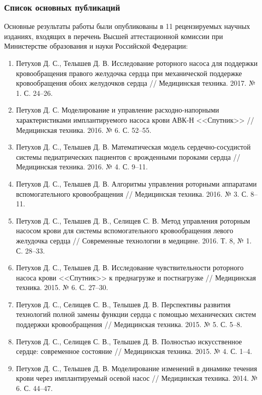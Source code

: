 \documentclass[a4paper, 9pt]{beamer}
\begin{document}

\begin{frame}
\frametitle{Список основных публикаций}

\scriptsize

Основные результаты работы были опубликованы в 11 рецензируемых научных изданиях, входящих в перечень Высшей аттестационной комиссии при Министерстве образования и науки Российской Федерации: 

\begin{enumerate}%
  \item Петухов Д. С., Телышев Д. В. Исследование роторного насоса для поддержки кровообращения правого желудочка сердца при механической поддержке кровообращения обоих желудочков сердца // Медицинская техника. 2017. № 1. С. 24--26.
  \item Петухов Д. С. Моделирование и управление расходно-напорными характеристиками имплантируемого насоса крови АВК-Н <<Спутник>> // Медицинская техника. 2016. № 6. С. 52--55.
  \item Петухов Д. С., Телышев Д. В. Математическая модель сердечно-сосудистой системы педиатрических пациентов с врожденными пороками сердца // Медицинская техника. 2016. № 4. С. 9--11.
  \item Петухов Д. С., Телышев Д. В. Алгоритмы управления роторными аппаратами вспомогательного кровообращения // Медицинская техника. 2016. № 3. С. 8--11.
  \item Петухов Д. С., Телышев Д. В., Селищев С. В. Метод управления роторным насосом крови для системы вспомогательного кровообращения левого желудочка сердца // Современные технологии в медицине. 2016. Т. 8, № 1. С. 28--33.
  \item Петухов Д. С., Телышев Д. В. Исследование чувствительности роторного насоса крови <<Спутник>> к преднагрузке и постнагрузке // Медицинская техника. 2015. № 6. С. 27--30.
  \item Петухов Д. С., Селищев С. В., Телышев Д. В. Перспективы развития технологий полной замены функции сердца с помощью механических систем
поддержки кровообращения // Медицинская техника. 2015. № 5. С. 5--8.
  \item Петухов Д. С., Селищев С. В., Телышев Д. В. Полностью искусственное сердце: современное состояние // Медицинская техника. 2015. № 4. С. 1--4.
  \item Петухов Д. С., Телышев Д. В. Моделирование изменений в динамике течения крови через имплантируемый осевой насос // Медицинская техника. 2014. № 6. С. 44--47.

\end{enumerate}
\end{frame}
\end{document}
